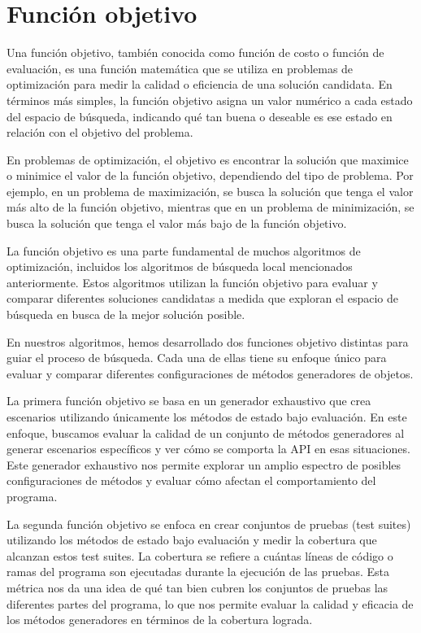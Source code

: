 \section{Función objetivo}
\label{sec:fitness}

Una función objetivo, también conocida como función de costo o función de evaluación, es una función matemática que se utiliza en problemas de optimización para medir la calidad o eficiencia de una solución candidata. En términos más simples, la función objetivo asigna un valor numérico a cada estado del espacio de búsqueda, indicando qué tan buena o deseable es ese estado en relación con el objetivo del problema.

En problemas de optimización, el objetivo es encontrar la solución que maximice o minimice el valor de la función objetivo, dependiendo del tipo de problema. Por ejemplo, en un problema de maximización, se busca la solución que tenga el valor más alto de la función objetivo, mientras que en un problema de minimización, se busca la solución que tenga el valor más bajo de la función objetivo.

La función objetivo es una parte fundamental de muchos algoritmos de optimización, incluidos los algoritmos de búsqueda local mencionados anteriormente. Estos algoritmos utilizan la función objetivo para evaluar y comparar diferentes soluciones candidatas a medida que exploran el espacio de búsqueda en busca de la mejor solución posible.


En nuestros algoritmos, hemos desarrollado dos funciones objetivo distintas para guiar el proceso de búsqueda. Cada una de ellas tiene su enfoque único para evaluar y comparar diferentes configuraciones de métodos generadores de objetos.

La primera función objetivo se basa en un generador exhaustivo que crea escenarios utilizando únicamente los métodos de estado bajo evaluación. En este enfoque, buscamos evaluar la calidad de un conjunto de métodos generadores al generar escenarios específicos y ver cómo se comporta la API en esas situaciones. Este generador exhaustivo nos permite explorar un amplio espectro de posibles configuraciones de métodos y evaluar cómo afectan el comportamiento del programa.

La segunda función objetivo se enfoca en crear conjuntos de pruebas (test suites) utilizando los métodos de estado bajo evaluación y medir la cobertura que alcanzan estos test suites. La cobertura se refiere a cuántas líneas de código o ramas del programa son ejecutadas durante la ejecución de las pruebas. Esta métrica nos da una idea de qué tan bien cubren los conjuntos de pruebas las diferentes partes del programa, lo que nos permite evaluar la calidad y eficacia de los métodos generadores en términos de la cobertura lograda.

